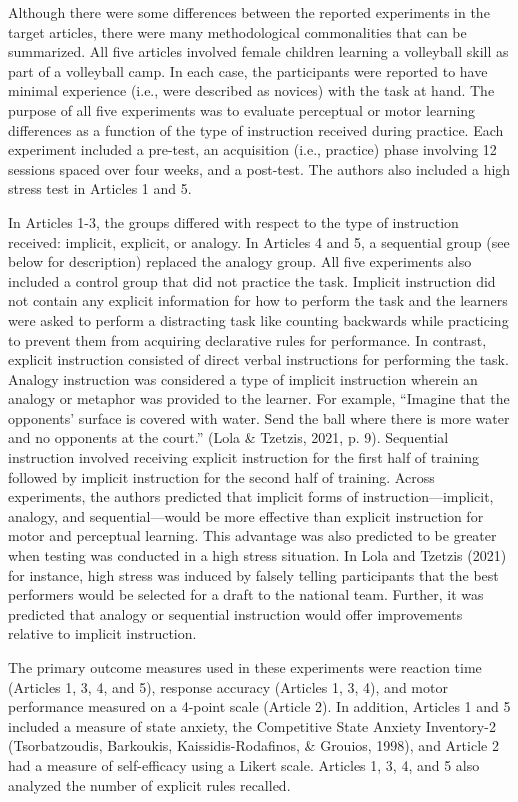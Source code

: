 \documentclass[
  english,
  man, donotrepeattitle,floatsintext]{apa7}
\begin{document}
Although there were some differences between the reported experiments in the target articles, there were many methodological commonalities that can be summarized. All five articles involved female children learning a volleyball skill as part of a volleyball camp. In each case, the participants were reported to have minimal experience (i.e., were described as novices) with the task at hand. The purpose of all five experiments was to evaluate perceptual or motor learning differences as a function of the type of instruction received during practice. Each experiment included a pre-test, an acquisition (i.e., practice) phase involving 12 sessions spaced over four weeks, and a post-test. The authors also included a high stress test in Articles 1 and 5.

In Articles 1-3, the groups differed with respect to the type of instruction received: implicit, explicit, or analogy. In Articles 4 and 5, a sequential group (see below for description) replaced the analogy group. All five experiments also included a control group that did not practice the task. Implicit instruction did not contain any explicit information for how to perform the task and the learners were asked to perform a distracting task like counting backwards while practicing to prevent them from acquiring declarative rules for performance. In contrast, explicit instruction consisted of direct verbal instructions for performing the task. Analogy instruction was considered a type of implicit instruction wherein an analogy or metaphor was provided to the learner. For example, ``Imagine that the opponents' surface is covered with water. Send the ball where there is more water and no opponents at the court.'' (Lola \& Tzetzis, 2021, p. 9). Sequential instruction involved receiving explicit instruction for the first half of training followed by implicit instruction for the second half of training. Across experiments, the authors predicted that implicit forms of instruction---implicit, analogy, and sequential---would be more effective than explicit instruction for motor and perceptual learning. This advantage was also predicted to be greater when testing was conducted in a high stress situation. In Lola and Tzetzis (2021) for instance, high stress was induced by falsely telling participants that the best performers would be selected for a draft to the national team. Further, it was predicted that analogy or sequential instruction would offer improvements relative to implicit instruction.

The primary outcome measures used in these experiments were reaction time (Articles 1, 3, 4, and 5), response accuracy (Articles 1, 3, 4), and motor performance measured on a 4-point scale (Article 2). In addition, Articles 1 and 5 included a measure of state anxiety, the Competitive State Anxiety Inventory-2 (Tsorbatzoudis, Barkoukis, Kaissidis-Rodafinos, \& Grouios, 1998), and Article 2 had a measure of self-efficacy using a Likert scale. Articles 1, 3, 4, and 5 also analyzed the number of explicit rules recalled.
\end{document}
